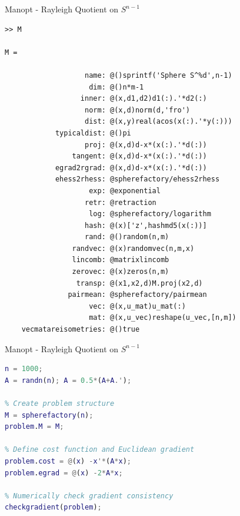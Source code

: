 \documentclass[xcolor=dvipsnames,t]{beamer} %
\begin{document}
\begin{frame}[fragile]{Manopt - Rayleigh Quotient on $S^{n-1}$}

{\tiny
\begin{verbatim}
>> M

M = 

                   name: @()sprintf('Sphere S^%d',n-1)
                    dim: @()n*m-1
                  inner: @(x,d1,d2)d1(:).'*d2(:)
                   norm: @(x,d)norm(d,'fro')
                   dist: @(x,y)real(acos(x(:).'*y(:)))
            typicaldist: @()pi
                   proj: @(x,d)d-x*(x(:).'*d(:))
                tangent: @(x,d)d-x*(x(:).'*d(:))
            egrad2rgrad: @(x,d)d-x*(x(:).'*d(:))
            ehess2rhess: @spherefactory/ehess2rhess
                    exp: @exponential
                   retr: @retraction
                    log: @spherefactory/logarithm
                   hash: @(x)['z',hashmd5(x(:))]
                   rand: @()random(n,m)
                randvec: @(x)randomvec(n,m,x)
                lincomb: @matrixlincomb
                zerovec: @(x)zeros(n,m)
                 transp: @(x1,x2,d)M.proj(x2,d)
               pairmean: @spherefactory/pairmean
                    vec: @(x,u_mat)u_mat(:)
                    mat: @(x,u_vec)reshape(u_vec,[n,m])
    vecmatareisometries: @()true
\end{verbatim} 
}
\end{frame}

\begin{frame}[fragile]{Manopt - Rayleigh Quotient on $S^{n-1}$}

{
\begin{lstlisting}[language=Matlab,escapechar=!]
% Generate symmetric matrix
n = 1000;
A = randn(n); A = 0.5*(A+A.');

% Create problem structure
M = spherefactory(n);
problem.M = M;

% Define cost function and Euclidean gradient
problem.cost = @(x) -x'*(A*x);
problem.egrad = @(x) -2*A*x;

% Numerically check gradient consistency
checkgradient(problem);
\end{lstlisting}
}

\end{frame}
\end{document}

